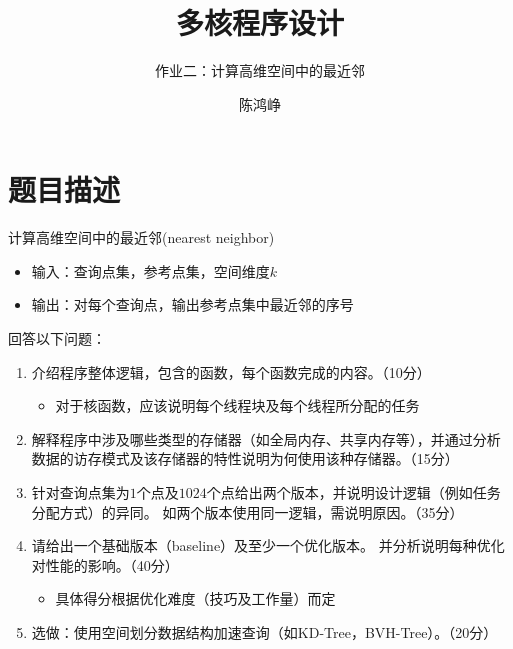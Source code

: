 \documentclass[logo,reportComp]{thesis}
\title{多核程序设计}
\subtitle{作业二：计算高维空间中的最近邻}
\author{陈鸿峥}
\begin{document}
\maketitle
\tableofcontents

\newpage

\section{题目描述}
计算高维空间中的最近邻(nearest neighbor)
\begin{itemize}
	\item 输入：查询点集，参考点集，空间维度$k$
	\item 输出：对每个查询点，输出参考点集中最近邻的序号
\end{itemize}

回答以下问题：
\begin{enumerate}
	\item 介绍程序整体逻辑，包含的函数，每个函数完成的内容。（10分）
	\begin{itemize}
		\item 对于核函数，应该说明每个线程块及每个线程所分配的任务
	\end{itemize}
	\item 解释程序中涉及哪些类型的存储器（如全局内存、共享内存等），并通过分析数据的访存模式及该存储器的特性说明为何使用该种存储器。（15分）
	\item 针对查询点集为$1$个点及$1024$个点给出两个版本，并说明设计逻辑（例如任务分配方式）的异同。
	如两个版本使用同一逻辑，需说明原因。（35分）
	\item 请给出一个基础版本（baseline）及至少一个优化版本。
	并分析说明每种优化对性能的影响。（40分）
	\begin{itemize}
		\item 具体得分根据优化难度（技巧及工作量）而定
	\end{itemize}
	\item 选做：使用空间划分数据结构加速查询（如KD-Tree，BVH-Tree）。（20分）
\end{enumerate}
\end{document}
